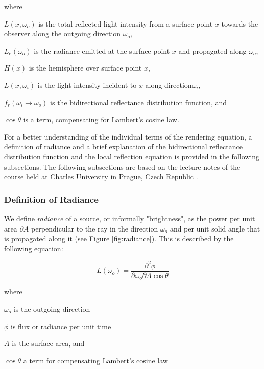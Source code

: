 \noindent where
\begin{description}
	\setlength\itemsep{0.05em}
	\item  $L(x, \omega_{o})$ is the total reflected light intensity from a surface point $x$ towards the observer along the outgoing direction $\omega_{o}$,
	\item  $L_{e}(\omega_{o})$ is the radiance emitted at the surface point $x$ and propagated along $\omega_{o}$,
	\item  $H(x)$ is the hemisphere over surface point $x$,
	\item 	$L(x, \omega_{i})$ is the light intensity incident to $x$ along direction$\omega_{i}$, 
	\item  $f_{r}(\omega_{i} \rightarrow \omega_{o})$ is the bidirectional reflectance distribution function, and 
	\item  $\cos\theta$ is a term, compensating for Lambert's cosine law.
\end{description}

For a better understanding of the individual terms of the rendering equation, a definition of radiance and a brief explanation of the bidirectional reflectance distribution function and the local reflection equation is provided in the following subsections.
The following subsections are based on the lecture notes of the course  held at Charles University in Prague, Czech Republic \cite{cg3}.

\subsubsection{Definition of Radiance}

We define \emph{radiance} of a source, or informally "brightness", as the power per unit area $\partial A$ perpendicular to the ray in the direction $\omega_{o}$ and per unit solid angle that is propagated along it (see Figure \ref{fig:radiance}). This is described by the following equation:

\begin{equation}
L(\omega_{o}) = \frac{\partial^2\phi}{\partial\omega_{o}\partial A\cos\theta}
\end{equation}

\noindent where
\begin{description}
	\setlength\itemsep{0.05em}
	\item  $\omega_{o}$ is the outgoing direction
	\item  $\phi$ is flux or radiance per unit time
	\item  $A$ is the surface area, and
	\item  $\cos\theta$ a term for compensating Lambert's cosine law
\end{description}

